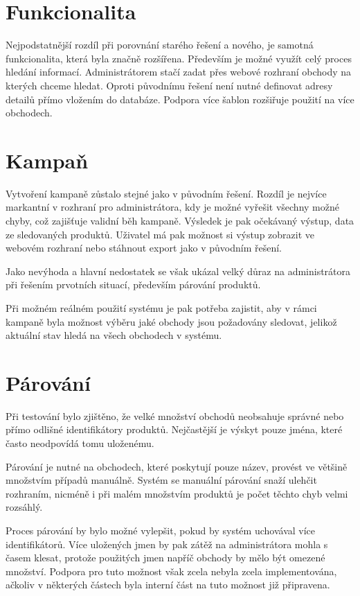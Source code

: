 \documentclass[thesis=B,czech]{FITthesis}[2012/06/26]
\begin{document}
\section{Funkcionalita}
Nejpodstatnější rozdíl při porovnání starého řešení a nového, je samotná funkcionalita, která byla značně rozšířena. Především je možné
využít celý proces hledání informací. Administrátorem stačí zadat přes webové rozhraní obchody na kterých chceme hledat.
Oproti původnímu řešení není nutné definovat adresy detailů přímo vložením do databáze. 
Podpora více šablon rozšiřuje použití na více obchodech.

\section{Kampaň}
Vytvoření kampaně zůstalo stejné jako v původním řešení. Rozdíl je nejvíce markantní v rozhraní pro administrátora, kdy je
možné vyřešit všechny možné chyby, což zajišťuje validní běh kampaně. Výsledek je pak očekávaný výstup, data ze sledovaných
produktů. Uživatel má pak možnost si výstup zobrazit ve webovém rozhraní nebo stáhnout export jako v původním řešení.
\par
Jako nevýhoda a hlavní nedostatek se však ukázal velký důraz na administrátora při řešením prvotních situací, především párování produktů.
\par
Při možném reálném použití systému je pak potřeba zajistit, aby v rámci kampaně byla možnost výběru jaké obchody jsou požadovány sledovat, jelikož
aktuální stav hledá na všech obchodech v systému.


\section{Párování}
Při testování bylo zjištěno, že velké množství obchodů neobsahuje správné nebo přímo odlišné identifikátory produktů. Nejčastější je výskyt pouze jména, které často neodpovídá tomu uloženému.
\par
Párování je nutné na obchodech, které poskytují pouze název, provést ve většině množstvím případů manuálně. Systém se manuální párování snaží ulehčit rozhraním, nicméně i při malém množstvím 
produktů je počet těchto chyb velmi rozsáhlý. 
\par
Proces párování by bylo možné vylepšit, pokud by systém uchovával více identifikátorů. Více uložených jmen by pak zátěž na administrátora mohla s časem klesat, protože použitých jmen napříč obchody by mělo být omezené množství. 
Podpora pro tuto možnost však zcela nebyla zcela implementována, ačkoliv v některých částech byla interní část na tuto možnost již připravena.
\end{document}
